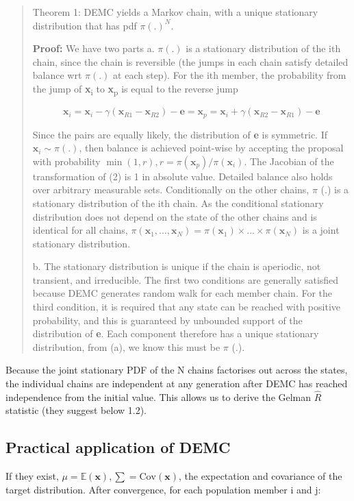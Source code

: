 \documentclass[a4paper]{article}
\begin{document}
\begin{quote}
Theorem 1: DEMC yields a Markov chain, with a unique stationary distribution that has pdf \(\pi (.)^N\).

\textbf{Proof:} We have two parts
a. \(\pi(.)\) is a stationary distribution of the ith chain, since the chain is reversible (the jumps in each chain satisfy detailed balance wrt \(\pi (.)\) at each step). For the ith member, the probability from the jump of \textbf{x}\textsubscript{i} to \textbf{x}\textsubscript{p} is equal to the reverse jump

\[\mathbf{x}_i = \mathbf{x}_i - \gamma (\mathbf{x}_{R1} - \mathbf{x}_{R2}) - \mathbf{e} = \mathbf{x}_p = \mathbf{x}_i + \gamma (\mathbf{x}_{R2} - \mathbf{x}_{R1}) - \mathbf{e} \]

Since the pairs are equally likely, the distribution of \textbf{e} is symmetric. If \(\mathbf{x}_i \sim \pi (.)\), then balance is achieved point-wise by accepting the proposal with probability \(\min (1,r), r = \pi(\mathbf{x}_p)/ \pi (\mathbf{x}_i)\). The Jacobian of the transformation of (2) is 1 in absolute value. Detailed balance also holds over arbitrary measurable sets. Conditionally on the other chains, \(\pi\) (.) is a stationary distribution of the ith chain. As the conditional stationary distribution does not depend on the state of the other chains and is identical for all chains, \(\pi (\mathbf{x}_1, ..., \mathbf{x}_N) = \pi (\mathbf{x}_1) \times ... \times \pi (\mathbf{x}_N)\) is a joint stationary distribution.

b. The stationary distribution is unique if the chain is aperiodic, not transient, and irreducible. The first two conditions are generally satisfied because DEMC generates random walk for each member chain. For the third condition, it is required that any state can be reached with positive probability, and this is guaranteed by unbounded support of the distribution of \textbf{e}. Each component therefore has a unique stationary distribution, from (a), we know this must be \(\pi\) (.).
\end{quote}

Because the joint stationary PDF of the N chains factorises out across the states, the individual chains are independent at any generation after DEMC has reached independence from the initial value. This allows us to derive the Gelman \(\hat{R}\) statistic (they suggest below 1.2). 
\subsection{Practical application of DEMC}
\label{sec:org922855b}
If they exist, \(\mu = \mathbb{E}(\mathbf{x}), \sum = \text{Cov}(\mathbf{x})\), the expectation and covariance of the target distribution. After convergence, for each population member i and j:
\end{document}
